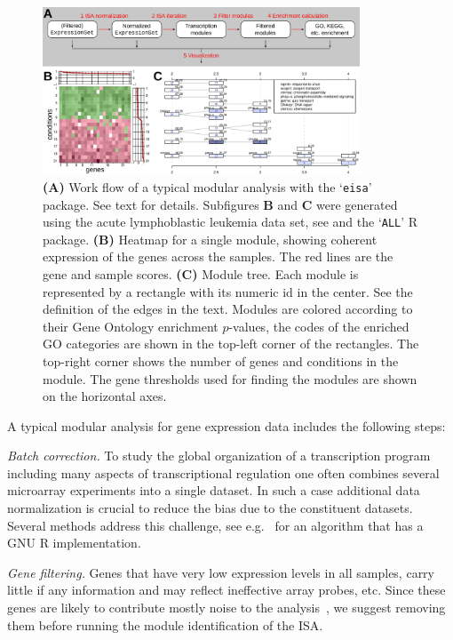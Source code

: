 \documentclass{bioinfo}
\newcommand{\Rpackage}[1]{`\texttt{#1}'}
\newcommand{\subfig}[1]{\textbf{#1}}
\begin{document}
\begin{figure}
\centering
\includegraphics[width=0.842\textwidth]{isa2workflow3}
\caption{\subfig{(A)} Work flow of a typical modular analysis with the
  \Rpackage{eisa} package. See text for details.
  Subfigures \subfig{B} and \subfig{C} were generated
  using the acute lymphoblastic leukemia data set, see
  \citep{chiaretti04} and the \Rpackage{ALL} R package.
  \subfig{(B)} Heatmap for a single module, showing coherent
  expression of the genes across the samples. The red lines are the gene and
  sample scores.
  \subfig{(C)} Module tree. Each module is represented by a rectangle
  with its numeric id in the center. See the definition of the edges in the
  text. Modules are colored 
  according to their Gene Ontology enrichment $p$-values, the codes of
  the enriched GO categories are shown in the top-left corner of the
  rectangles. The top-right corner shows the number of genes and
  conditions in the module. The gene thresholds used for finding
  the modules are shown on the horizontal axes.
}
\label{fig:workflow}
\end{figure}

A typical modular analysis for gene expression data includes the following
steps:

\emph{Batch correction.}
To study the global organization of a transcription program including
many aspects of transcriptional regulation one often combines several
microarray experiments into a single dataset. In such a case
additional data normalization is crucial to reduce the bias due to
the constituent datasets. Several methods address this challenge,
see e.g.~\citep{johnson07} for an algorithm that has a GNU R
implementation.

\emph{Gene filtering.}
Genes that have very low expression levels in all samples, carry little if
any information and may reflect ineffective array probes, etc. Since these
genes are likely to contribute mostly noise to the
analysis~\citep{hackstadt09}, we suggest removing them before running
the module identification of the ISA.
\end{document}
